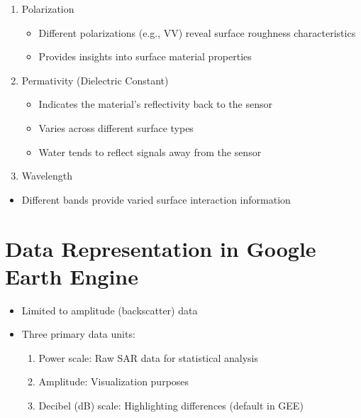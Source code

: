 \documentclass[
  letterpaper,
]{scrbook}
\providecommand{\tightlist}{%
  \setlength{\itemsep}{0pt}\setlength{\parskip}{0pt}}\usepackage{longtable,booktabs,array}
\begin{document}
\begin{enumerate}
\def\labelenumi{\arabic{enumi}.}
\item
  Polarization

  \begin{itemize}
  \item
    Different polarizations (e.g., VV) reveal surface roughness
    characteristics
  \item
    Provides insights into surface material properties
  \end{itemize}
\item
  Permativity (Dielectric Constant)

  \begin{itemize}
  \item
    Indicates the material's reflectivity back to the sensor
  \item
    Varies across different surface types
  \item
    Water tends to reflect signals away from the sensor
  \end{itemize}
\item
  Wavelength
\end{enumerate}

\begin{itemize}
\tightlist
\item
  Different bands provide varied surface interaction information
\end{itemize}

\section{Data Representation in Google Earth
Engine}\label{data-representation-in-google-earth-engine}

\begin{itemize}
\item
  Limited to amplitude (backscatter) data
\item
  Three primary data units:

  \begin{enumerate}
  \def\labelenumi{\arabic{enumi}.}
  \item
    Power scale: Raw SAR data for statistical analysis
  \item
    Amplitude: Visualization purposes
  \item
    Decibel (dB) scale: Highlighting differences (default in GEE)
  \end{enumerate}
\end{itemize}
\end{document}
